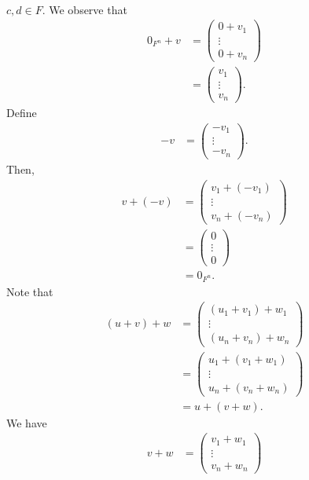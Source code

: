 \documentclass[10pt]{mypackage}
\begin{document}
\begin{example}[$F^{n}$]
\begin{align*}
  \end{align*}
  $c,d\in F$. We observe that
  \begin{align*}
    0_{F^n} + v &= \begin{pmatrix}0 + v_1\\\vdots\\0 + v_n\end{pmatrix}\\
                 &= \begin{pmatrix}v_1\\\vdots\\v_n\end{pmatrix}.
  \end{align*}
  Define
  \begin{align*}
    -v &= \begin{pmatrix}-v_1\\\vdots\\-v_n\end{pmatrix}.
  \end{align*}
  Then,
  \begin{align*}
    v + (-v) &= \begin{pmatrix}v_1 + \left(-v_1\right)\\\vdots\\v_n + \left(-v_n\right)\end{pmatrix}\\
             &= \begin{pmatrix}0\\\vdots\\0\end{pmatrix}\\
             &= 0_{F^n}.
  \end{align*}
  Note that
  \begin{align*}
    (u + v) + w &= \begin{pmatrix}\left(u_1 + v_1\right) + w_1 \\\vdots\\\left(u_n + v_n\right) + w_n\end{pmatrix}\\
                &= \begin{pmatrix}u_1 + \left(v_1 + w_1\right) \\\vdots\\u_n + \left(v_n + w_n\right)\end{pmatrix}\\
                &= u + (v+w).
  \end{align*}
  We have
  \begin{align*}
    v +w &= \begin{pmatrix}v_1 + w_1 \\\vdots\\v_n + w_n\end{pmatrix}\\

\end{align*}
\end{example}
\end{document}

